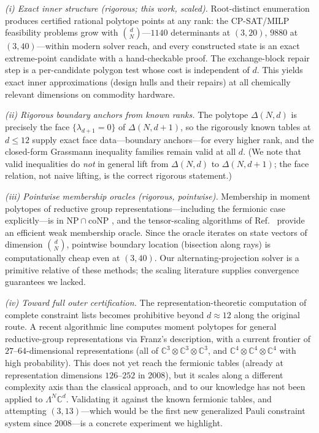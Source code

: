 \documentclass[11pt]{article}
\begin{document}
\emph{(i) Exact inner structure (rigorous; this work, scaled).} Root-distinct
enumeration produces certified rational polytope points at any rank: the
CP-SAT/MILP feasibility problems grow with $\binom{d}{N}$---$1140$
determinants at $(3,20)$, $9880$ at $(3,40)$---within modern solver reach,
and every constructed state is an exact extreme-point candidate with a
hand-checkable proof. The exchange-block repair step is a per-candidate
polygon test whose cost is independent of $d$. This yields exact inner
approximations (design hulls and their repairs) at all chemically relevant
dimensions on commodity hardware.

\emph{(ii) Rigorous boundary anchors from known ranks.} The polytope
$\Delta(N,d)$ is precisely the face $\{\lambda_{d+1}=0\}$ of
$\Delta(N,d+1)$, so the rigorously known tables at $d \le 12$ supply exact
face data---boundary anchors---for every higher rank, and the closed-form
Grassmann inequality families remain valid at all $d$. (We note that valid
inequalities do \emph{not} in general lift from $\Delta(N,d)$ to
$\Delta(N,d+1)$; the face relation, not naive lifting, is the correct
rigorous statement.)

\emph{(iii) Pointwise membership oracles (rigorous, pointwise).} Membership
in moment polytopes of reductive group representations---including the
fermionic case explicitly---is in $\mathrm{NP}\cap\mathrm{coNP}$
\cite{BCMW17}, and the tensor-scaling algorithms of
Ref.~\cite{BFGOWW18} provide an efficient weak membership oracle. Since the
oracle iterates on state vectors of dimension $\binom{d}{N}$, pointwise
boundary location (bisection along rays) is computationally cheap even at
$(3,40)$. Our alternating-projection solver is a primitive relative of these
methods; the scaling literature supplies convergence guarantees we lacked.

\emph{(iv) Toward full outer certification.} The representation-theoretic
computation of complete constraint lists becomes prohibitive beyond
$d \approx 12$ along the original route. A recent algorithmic line
\cite{vdBerg25} computes moment polytopes for general reductive-group
representations via Franz's description, with a current frontier of
$27$--$64$-dimensional representations (all of
$\mathbb{C}^3{\otimes}\mathbb{C}^3{\otimes}\mathbb{C}^3$, and
$\mathbb{C}^4{\otimes}\mathbb{C}^4{\otimes}\mathbb{C}^4$ with high
probability). This does not yet reach the fermionic tables (already at
representation dimensions $126$--$252$ in 2008), but it scales along a
different complexity axis than the classical approach, and to our knowledge
has not been applied to $\Lambda^N\mathbb{C}^d$. Validating it against the
known fermionic tables, and attempting $(3,13)$---which would be the first
new generalized Pauli constraint system since 2008---is a concrete
experiment we highlight.
\end{document}
